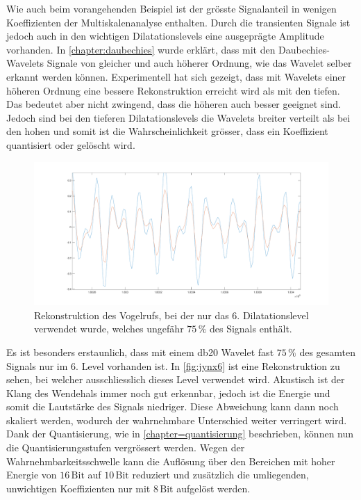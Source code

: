 \begin{refsection}
Wie auch beim vorangehenden Beispiel ist der grösste Signalanteil in wenigen Koeffizienten der Multiskalenanalyse enthalten.
Durch die transienten Signale ist jedoch auch in den wichtigen Dilatationslevels eine ausgeprägte Amplitude vorhanden.
In \autoref{chapter:daubechies} wurde erklärt, dass mit den Daubechies-Wavelets Signale von gleicher und auch höherer Ordnung, wie das Wavelet selber erkannt werden können. 
Experimentell hat sich gezeigt, dass mit Wavelets einer höheren Ordnung eine bessere Rekonstruktion erreicht wird als mit den tiefen.
Das bedeutet aber nicht zwingend, dass die höheren auch besser geeignet sind.
Jedoch sind bei den tieferen Dilatationslevels die Wavelets breiter verteilt als bei den hohen und somit ist die Wahrscheinlichkeit grösser, dass ein Koeffizient quantisiert oder gelöscht wird. 
\begin{figure}
	\centering
	\includegraphics[width=\linewidth]{papers/compress/Bilder/jynxNear.pdf}
	\caption{Rekonstruktion des Vogelrufs, bei der nur das 6. Dilatationslevel verwendet wurde, welches ungefähr $75\,\textbf{\%}$ des Signals enthält.}
	\label{fig:jynx6}
\end{figure}
Es ist besonders erstaunlich, dass mit einem db20 Wavelet fast $75\,\text{\%}$ des gesamten Signals nur im 6. Level vorhanden ist.
In \autoref{fig:jynx6} ist eine Rekonstruktion zu sehen, bei welcher ausschliesslich dieses Level verwendet wird.
Akustisch ist der Klang des Wendehals immer noch gut erkennbar, jedoch ist die Energie und somit die Lautstärke des Signals niedriger.
Diese Abweichung kann dann noch skaliert werden, wodurch der wahrnehmbare Unterschied weiter verringert wird.
Dank der Quantisierung, wie in \autoref{chapter=quantisierung} beschrieben, können nun die Quantisierungsstufen vergrössert werden.
Wegen der Wahrnehmbarkeitsschwelle kann die Auflösung über den Bereichen mit hoher Energie von $16\,\text{Bit}$ auf $10\,\text{Bit}$ reduziert und zusätzlich die umliegenden, unwichtigen Koeffizienten nur mit $8\,\text{Bit}$ aufgelöst werden.


\end{refsection}
